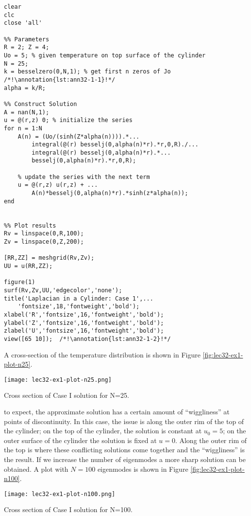\begin{lstlisting}[name=lec32-ex1, style=myMatlab]
clear
clc
close 'all'

%% Parameters
R = 2; Z = 4;
Uo = 5; % given temperature on top surface of the cylinder
N = 25;
k = besselzero(0,N,1); % get first n zeros of Jo    /*!\annotation{lst:ann32-1-1}!*/
alpha = k/R;

%% Construct Solution
A = nan(N,1);
u = @(r,z) 0; % initialize the series
for n = 1:N
    A(n) = (Uo/(sinh(Z*alpha(n)))).*...
        integral(@(r) besselj(0,alpha(n)*r).*r,0,R)./...
        integral(@(r) besselj(0,alpha(n)*r).*...
        besselj(0,alpha(n)*r).*r,0,R);
    
    % update the series with the next term
    u = @(r,z) u(r,z) + ...
        A(n)*besselj(0,alpha(n)*r).*sinh(z*alpha(n));    
end


%% Plot results
Rv = linspace(0,R,100);
Zv = linspace(0,Z,200);

[RR,ZZ] = meshgrid(Rv,Zv);
UU = u(RR,ZZ);

figure(1)
surf(Rv,Zv,UU,'edgecolor','none');
title('Laplacian in a Cylinder: Case 1',...
    'fontsize',18,'fontweight','bold');
xlabel('R','fontsize',16,'fontweight','bold');
ylabel('Z','fontsize',16,'fontweight','bold');
zlabel('U','fontsize',16,'fontweight','bold');
view([65 10]);  /*!\annotation{lst:ann32-1-2}!*/
\end{lstlisting}
A cross-section of the temperature distribution is shown in Figure \ref{fig:lec32-ex1-plot-n25}. 
\begin{marginfigure}
\texttt{[image: lec32-ex1-plot-n25.png]}
\caption{Cross section of Case I solution for N=25.}
\label{fig:lec32-ex1-plot-n25}
\end{marginfigure}
 to expect, the approximate solution has a certain amount of ``wiggliness'' at points of discontinuity.  In this case, the issue is along the outer rim of the top of the cylinder; on the top of the cylinder, the solution is constant at $u_0 = 5$; on the outer surface of the cylinder the solution is fixed at $u = 0$.  Along the outer rim of the top is where these conflicting solutions come together and the ``wiggliness'' is the result.  If we increase the number of eigenmodes a more sharp solution can be obtained.  A plot with $N=100$ eigenmodes is shown in Figure \ref{fig:lec32-ex1-plot-n100}.
\begin{marginfigure}
\texttt{[image: lec32-ex1-plot-n100.png]}
\caption{Cross section of Case I solution for N=100.}
\label{fig:lec32-ex1-plot-n100}
\end{marginfigure}

